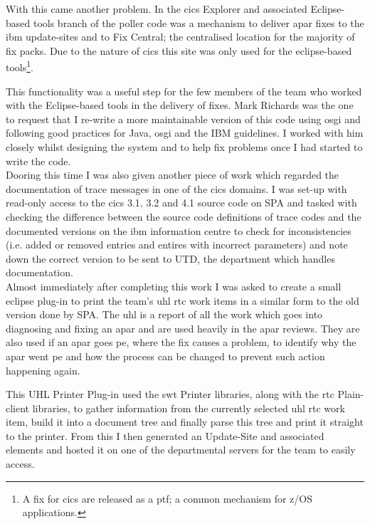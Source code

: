 \documentclass[a4paper,11pt]{report}
\begin{document}
With this came another problem. In the \gls{cics} Explorer and associated Eclipse-based tools 
branch of the poller code was a mechanism to deliver \gls{apar} fixes to the \gls{ibm} 
update-sites and to Fix Central; the centralised location for the majority of fix packs. Due to the
nature of \gls{cics} this site was only used for the eclipse-based tools\footnote{A fix for 
\gls{cics} are released as a \gls{ptf}; a common mechanism for z/OS applications.}.

This functionality was a useful step for the few members of the team who worked with the 
Eclipse-based tools in the delivery of fixes. Mark Richards was the one to request that I re-write
a more maintainable version of this code using \gls{osgi} and following good practices for Java,
\gls{osgi} and the IBM guidelines. I worked with him closely whilst designing the system and to 
help fix problems once I had started to write the code. \\



Dooring this time I was also given another piece of work which regarded the documentation of trace
messages in one of the \gls{cics} domains. I was set-up with read-only access to the \gls{cics} 
3.1, 3.2 and 4.1 source code on SPA and tasked with checking the difference between the source code
definitions of trace codes and the documented versions on the \gls{ibm} information centre to check
for inconsistencies (i.e. added or removed entries and entires with incorrect parameters) and note
down the correct version to be sent to UTD, the department which handles documentation. \\



Almost immediately after completing this work I was asked to create a small eclipse plug-in to print
the team's \gls{uhl} \gls{rtc} work items in a similar form to the old version done by SPA. The 
\gls{uhl} is a report of all the work which goes into diagnosing and fixing an \gls{apar} and are
used heavily in the \gls{apar} reviews. They are also used if an \gls{apar} goes \gls{pe}, where
the fix causes a problem, to identify why the \gls{apar} went \gls{pe} and how the process can be
changed to prevent such action happening again.

This UHL Printer Plug-in used the \gls{swt} Printer libraries, along with the \gls{rtc} 
Plain-client libraries, to gather information from the currently selected \gls{uhl} \gls{rtc} work
item, build it into a document tree and finally parse this tree and print it straight to the 
printer. From this I then generated an Update-Site and associated elements and hosted it on one of
the departmental servers for the team to easily access. \\
\end{document}
